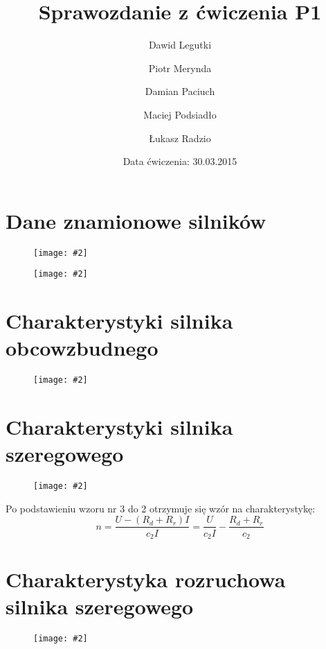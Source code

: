 \documentclass[12pt]{article}
\title{Sprawozdanie z ćwiczenia P1}
\author{ 
Dawid Legutki \and Piotr Merynda \and Damian Paciuch \and Maciej Podsiadło \and Łukasz Radzio}
\date{Data ćwiczenia: 30.03.2015}
\newcommand{\obrazek}[2]
{
	\begin{figure}[H]
	\centering
	\texttt{[image: \#2]}
	\end{figure}
}
\begin{document}
\maketitle

\section{Dane znamionowe silników}
	\obrazek{6}{tabele/DZ_obcowzbudny}
	\obrazek{6}{tabele/DZ_szeregowy}
\section{Charakterystyki silnika obcowzbudnego}

	\obrazek{12}{wykresy/Obcowzbudny}
	
	
\section{Charakterystyki silnika szeregowego}

	\obrazek{12}{wykresy/Szeregowy}
	
	Po podstawieniu wzoru nr 3 do 2 otrzymuje się wzór na charakterystykę:
	\begin{equation}
	n=\frac{U-(R_d+R_r)I}{c_2 I}=\frac{U}{c_2 I} - \frac{R_d+R_r}{c_2}
	\end{equation}
	
\section{Charakterystyka rozruchowa silnika szeregowego}

	\obrazek{12}{wykresy/Rozruchowa}
	
\end{document}
